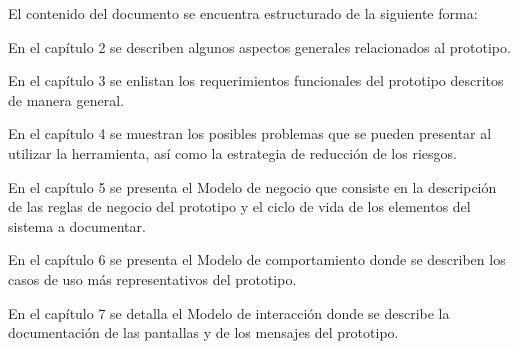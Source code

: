El contenido del documento se encuentra estructurado de la siguiente forma:

\begin{Citemize}
	\item En el capítulo 2  se describen algunos aspectos generales relacionados al prototipo.
	\item En el capítulo 3  se enlistan los requerimientos funcionales del prototipo descritos de manera general.
	\item En el capítulo 4  se muestran los posibles problemas que se pueden presentar al utilizar la herramienta, así como la estrategia de reducción de los riesgos.
	\item En el capítulo 5  se presenta el Modelo de negocio que consiste en la descripción de las reglas de negocio del prototipo y el ciclo de vida de los elementos del sistema a documentar.
	\item En el capítulo 6  se presenta el Modelo de comportamiento donde se describen los casos de uso más representativos del prototipo.
	\item En el capítulo 7  se detalla el Modelo de interacción donde se describe la documentación de las pantallas y de los mensajes del prototipo.
\end{Citemize}


